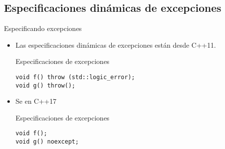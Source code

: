 \subsection{Especificaciones dinámicas de excepciones}

\begin{frame}[t,fragile]{Especificando excepciones}
\begin{itemize}
  \item Las especificaciones dinámicas de excepciones están 
        desde C++11.
\vfill
\begin{block}{Especificaciones de excepciones}
\begin{lstlisting}
void f() throw (std::logic_error);
void g() throw();
\end{lstlisting}
\end{block}
  \vfill\pause
  \item Se  en C++17
\begin{block}{Especificaciones de excepciones}
\begin{lstlisting}
void f();
void g() noexcept;
\end{lstlisting}
\end{block}
\end{itemize}
\end{frame}
